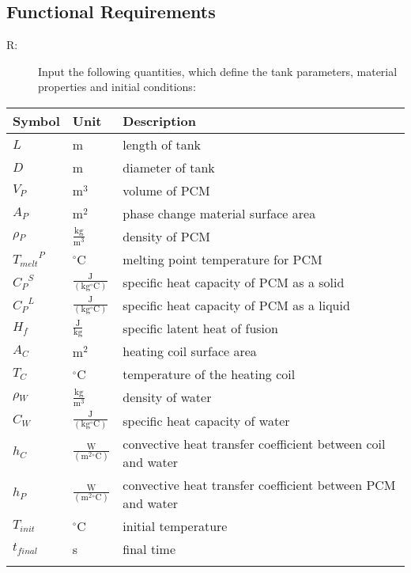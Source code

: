 \documentclass[12pt]{article}
\newcounter{reqnum}
\newcommand{\rthereqnum}{R\thereqnum}
\begin{document}
\subsection{Functional Requirements}
\label{Sec:FRs}
\begin{description}
\item[\rthereqnum\label{FR:req1}:]Input the following quantities, which define the tank parameters, material properties and initial conditions:
\end{description}
\begin{longtabu}{l l X[l]}
\toprule
Symbol & Unit & Description
\\
\midrule
$L$ & m & length of tank
\\
$D$ & m & diameter of tank
\\
${V_{P}}$ & $\text{m}^{3}$ & volume of PCM
\\
${A_{P}}$ & $\text{m}^{2}$ & phase change material surface area
\\
${\rho{}_{P}}$ & $\frac{\text{kg}}{\text{m}^{3}}$ & density of PCM
\\
${{T_{melt}}^{P}}$ & ${}^{\circ}$C & melting point temperature for PCM
\\
${{C_{P}}^{S}}$ & $\frac{\text{J}}{(\text{kg}{}^{\circ}\text{C})}$ & specific heat capacity of PCM as a solid
\\
${{C_{P}}^{L}}$ & $\frac{\text{J}}{(\text{kg}{}^{\circ}\text{C})}$ & specific heat capacity of PCM as a liquid
\\
${H_{f}}$ & $\frac{\text{J}}{\text{kg}}$ & specific latent heat of fusion
\\
${A_{C}}$ & $\text{m}^{2}$ & heating coil surface area
\\
${T_{C}}$ & ${}^{\circ}$C & temperature of the heating coil
\\
${\rho{}_{W}}$ & $\frac{\text{kg}}{\text{m}^{3}}$ & density of water
\\
${C_{W}}$ & $\frac{\text{J}}{(\text{kg}{}^{\circ}\text{C})}$ & specific heat capacity of water
\\
${h_{C}}$ & $\frac{\text{W}}{(\text{m}^{2}{}^{\circ}\text{C})}$ & convective heat transfer coefficient between coil and water
\\
${h_{P}}$ & $\frac{\text{W}}{(\text{m}^{2}{}^{\circ}\text{C})}$ & convective heat transfer coefficient between PCM and water
\\
${T_{init}}$ & ${}^{\circ}$C & initial temperature
\\
${t_{final}}$ & s & final time
\\
\bottomrule
\label{Table:InConstraints}
\end{longtabu}
\end{document}
